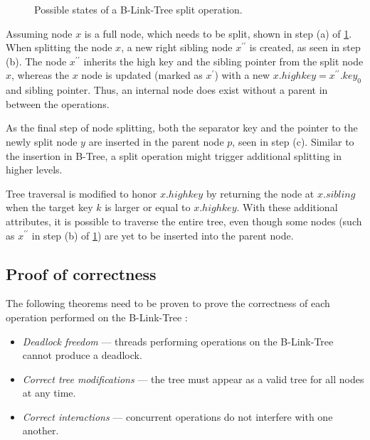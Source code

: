 \begin{figure}
  \centering
  
  \caption[Possible states of a B-Link-Tree split operation.]{Possible states of a B-Link-Tree split operation.}
  \label{figure:b-link-insert-states}
\end{figure}


Assuming node $x$ is a full node, which needs to be split, shown in step (a) of \cref{figure:b-link-insert-states}. When splitting the node $x$, a new right sibling node $x^{\prime\prime}$ is created, as seen in step (b). The node $x^{\prime\prime}$ inherits the high key and the sibling pointer from the split node $x$, whereas the $x$ node is updated (marked as $x^\prime$) with a new $x.highkey = x^{\prime\prime}.key_0$ and sibling pointer. Thus, an internal node does exist without a parent in between the operations.

As the final step of node splitting, both the separator key and the pointer to the newly split node $y$ are inserted in the parent node $p$, seen in step (c). Similar to the insertion in B-Tree, a split operation might trigger additional splitting in higher levels.

Tree traversal is modified to honor $x.highkey$ by returning the node at $x.\mathit{sibling}$ when the target key $k$ is larger or equal to $x.highkey$. With these additional attributes, it is possible to traverse the entire tree, even though some nodes (such as $x^{\prime\prime}$ in step (b) of \cref{figure:b-link-insert-states}) are yet to be inserted into the parent node.

\subsection{Proof of correctness}

The following theorems need to be proven to prove the correctness of each operation performed on the B-Link-Tree \cite{lehman}:

\begin{itemize}
  \item \textit{Deadlock freedom} --- threads performing operations on the B-Link-Tree cannot produce a deadlock.
  \item \textit{Correct tree modifications} --- the tree must appear as a valid tree for all nodes at any time.
  \item \textit{Correct interactions} --- concurrent operations do not interfere with one another.
\end{itemize}

